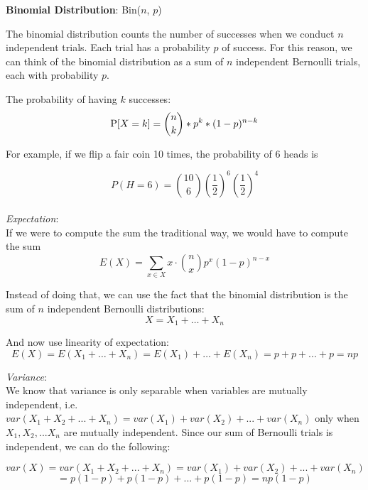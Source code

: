 \vspace{2 mm}
\textbf{Binomial Distribution}: Bin($n$, $p$)

The binomial distribution counts the number of successes when we conduct $n$ independent trials. Each trial has a probability $p$ of success. For this reason, we can think of the binomial distribution as a sum of $n$ independent Bernoulli trials, each with probability $p$. 

The probability of having $k$ successes:
$$\P[X = k] = {n \choose k} * p^k * (1 - p)^{n - k}$$

For example, if we flip a fair coin 10 times, the probability of 6 heads is

$$P(H = 6) = {10 \choose 6} \left(\frac{1}{2}\right)^6 \left(\frac{1}{2}\right)^4$$
\\

\textit{Expectation}: \\
If we were to compute the sum the traditional way, we would have to compute the sum
$$E(X) = \sum_{x \in X} x \cdot {n \choose x} p^x (1-p)^{n-x}$$

Instead of doing that, we can use the fact that the binomial distribution is the sum of $n$ independent Bernoulli distributions:
$$X = X_1 + \dotsc + X_n$$

And now use linearity of expectation:
$$E(X) = E(X_1 + \dotsc + X_n) = E(X_1) + \dotsc + E(X_n) = p + p + ... + p = np$$

\textit{Variance}: \\
We know that variance is only separable when variables are mutually independent, i.e. $var(X_1 + X_2 + ... + X_n) = var(X_1) + var(X_2) + ... + var(X_n)$ only when $X_1, X_2, ... X_n$ are mutually independent. Since our sum of Bernoulli trials is independent, we can do the following:

$$var(X) = var(X_1 + X_2 + ... + X_n) = var(X_1) + var(X_2) + ... + var(X_n)$$
$$= p(1-p) + p(1-p) + ... + p(1-p) = np(1-p)$$
